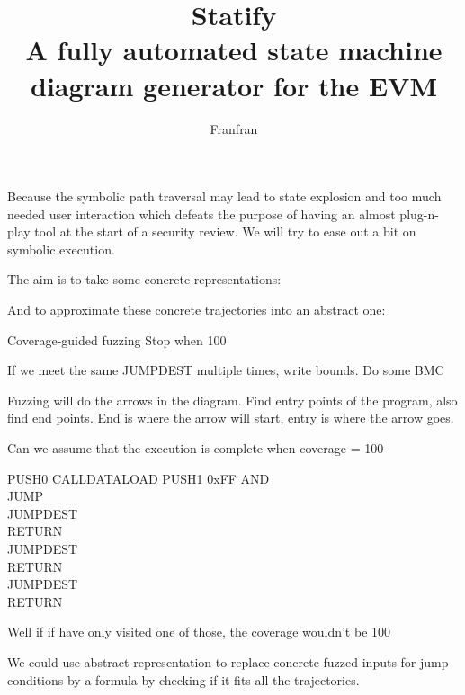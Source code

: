 \documentclass{article}
\title{Statify\\A fully automated state machine diagram generator for the EVM}
\author{Franfran}
\begin{document}
\maketitle

Because the symbolic path traversal may lead to state explosion and too much needed user interaction which defeats the purpose of having an almost plug-n-play tool at the start of a security review. We will try to ease out a bit on symbolic execution.

The aim is to take some concrete representations:


And to approximate these concrete trajectories into an abstract one:



Coverage-guided fuzzing
Stop when 100%

If we meet the same JUMPDEST multiple times, write bounds. Do some BMC

Fuzzing will do the arrows in the diagram.
Find entry points of the program, also find end points.
End is where the arrow will start, entry is where the arrow goes.


Can we assume that the execution is complete when coverage = 100%

PUSH0 CALLDATALOAD PUSH1 0xFF AND\\
JUMP\\
JUMPDEST\\
RETURN\\
JUMPDEST\\
RETURN\\
JUMPDEST\\
RETURN

Well if if have only visited one of those, the coverage wouldn't be 100%

We could use abstract representation to replace concrete fuzzed inputs for jump conditions by a formula by checking if it fits all the trajectories.
\end{document}
